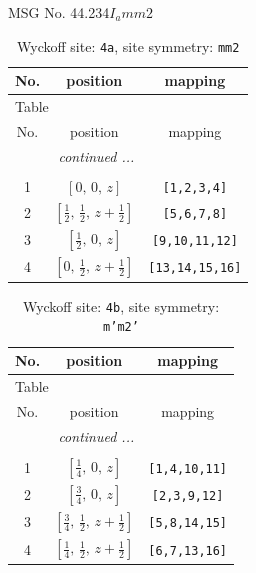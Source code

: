 \documentclass[fleqn,8pt]{jsarticle}
\begin{document}
\setcounter{MaxMatrixCols}{32}

\renewcommand{\tablename}{Table~}
\renewcommand{\figurename}{Figure~}
\begin{center}
\LARGE
MSG No. 44.234\quad$I_{a}mm2$
\end{center}
\renewcommand{\arraystretch}{1.2}
\begin{longtable}{ccc}
\caption{Wyckoff site: {\tt 4a}, site symmetry: {\tt mm2}}
 \\
 \hline \hline
No. & position & mapping \\ \hline \endfirsthead

\multicolumn{2}{l}{\tablename\ \thetable{}} \\
 \hline \hline
No. & position & mapping \\ \hline \endhead

 \hline \hline
\multicolumn{2}{r}{\footnotesize\it continued ...} \\ \endfoot

 \hline \hline
\multicolumn{2}{r}{} \\ \endlastfoot

1 & $\left[ 0,\, 0,\, z \right]$ & {\tt [1,2,3,4]} \\ \hline
2 & $\left[ \frac{1}{2},\, \frac{1}{2},\, z + \frac{1}{2} \right]$ & {\tt [5,6,7,8]} \\ \hline
3 & $\left[ \frac{1}{2},\, 0,\, z \right]$ & {\tt [9,10,11,12]} \\ \hline
4 & $\left[ 0,\, \frac{1}{2},\, z + \frac{1}{2} \right]$ & {\tt [13,14,15,16]} \\
\end{longtable}
\renewcommand{\arraystretch}{1.2}
\begin{longtable}{ccc}
\caption{Wyckoff site: {\tt 4b}, site symmetry: {\tt m'm2'}}
 \\
 \hline \hline
No. & position & mapping \\ \hline \endfirsthead

\multicolumn{2}{l}{\tablename\ \thetable{}} \\
 \hline \hline
No. & position & mapping \\ \hline \endhead

 \hline \hline
\multicolumn{2}{r}{\footnotesize\it continued ...} \\ \endfoot

 \hline \hline
\multicolumn{2}{r}{} \\ \endlastfoot

1 & $\left[ \frac{1}{4},\, 0,\, z \right]$ & {\tt [1,4,10,11]} \\ \hline
2 & $\left[ \frac{3}{4},\, 0,\, z \right]$ & {\tt [2,3,9,12]} \\ \hline
3 & $\left[ \frac{3}{4},\, \frac{1}{2},\, z + \frac{1}{2} \right]$ & {\tt [5,8,14,15]} \\ \hline
4 & $\left[ \frac{1}{4},\, \frac{1}{2},\, z + \frac{1}{2} \right]$ & {\tt [6,7,13,16]} \\
\end{longtable}
\end{document}
